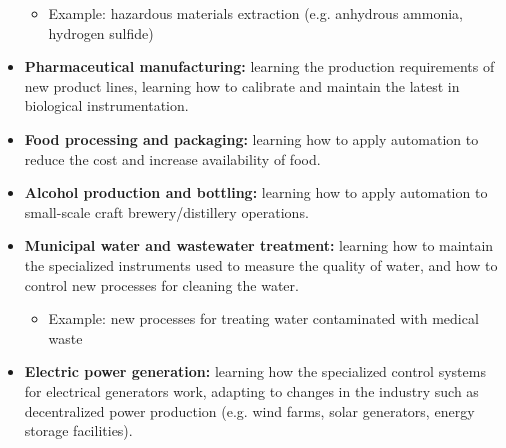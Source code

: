 \begin{itemize}
\begin{itemize}
\item{} Example: hazardous materials extraction (e.g. anhydrous ammonia, hydrogen sulfide)
\end{itemize}
\item{} {\bf Pharmaceutical manufacturing:} learning the production requirements of new product lines, learning how to calibrate and maintain the latest in biological instrumentation.  
\begin{itemize}

\end{itemize}
\item{} {\bf Food processing and packaging:} learning how to apply automation to reduce the cost and increase availability of food.
\begin{itemize}

\end{itemize}
\item{} {\bf Alcohol production and bottling:} learning how to apply automation to small-scale craft brewery/distillery operations.
\begin{itemize}

\end{itemize}
\item{} {\bf Municipal water and wastewater treatment:} learning how to maintain the specialized instruments used to measure the quality of water, and how to control new processes for cleaning the water.
\begin{itemize}

\item{} Example: new processes for treating water contaminated with medical waste
\end{itemize}
\item{} {\bf Electric power generation:} learning how the specialized control systems for electrical generators work, adapting to changes in the industry such as decentralized power production (e.g. wind farms, solar generators, energy storage facilities).
\begin{itemize}


\end{itemize}
\end{itemize}
